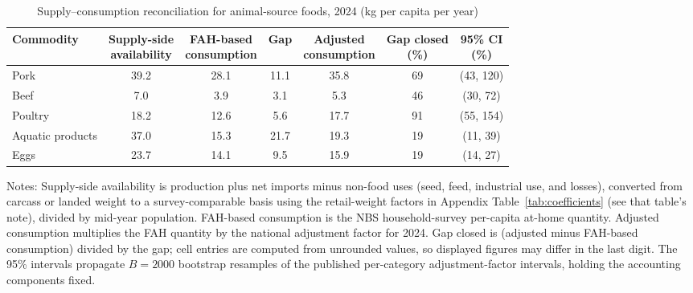 \documentclass[preprint,12pt,authoryear]{elsarticle}
\begin{document}
\begin{table}[htbp]
\centering
\begin{threeparttable}
\caption{Supply--consumption reconciliation for animal-source foods, 2024 (kg per capita per year)}
\label{tab:reconciliation}
\small
\setlength{\tabcolsep}{0pt}
\begin{tabular*}{\textwidth}{@{\extracolsep{\fill}} l cccccc @{}}
\toprule
Commodity & \shortstack{Supply-side\\availability} & \shortstack{FAH-based\\consumption} & Gap & \shortstack{Adjusted\\consumption} & \shortstack{Gap closed\\(\%)} & \shortstack{95\% CI\\(\%)} \\
\midrule
Pork             & 39.2 & 28.1 & 11.1 & 35.8 & 69 & (43, 120) \\
Beef             & 7.0  & 3.9  & 3.1  & 5.3  & 46 & (30, 72) \\
Poultry          & 18.2 & 12.6 & 5.6 & 17.7 & 91 & (55, 154) \\
Aquatic products & 37.0 & 15.3 & 21.7 & 19.3 & 19 & (11, 39) \\
Eggs             & 23.7 & 14.1 & 9.5 & 15.9 & 19 & (14, 27) \\
\bottomrule
\end{tabular*}
\begin{tablenotes}[flushleft]
\scriptsize
\item Notes: Supply-side availability is production plus net imports minus non-food uses (seed, feed, industrial use, and losses), converted from carcass or landed weight to a survey-comparable basis using the retail-weight factors in Appendix Table~\ref{tab:coefficients} (see that table's note), divided by mid-year population. FAH-based consumption is the NBS household-survey per-capita at-home quantity. Adjusted consumption multiplies the FAH quantity by the national adjustment factor for 2024. Gap closed is (adjusted minus FAH-based consumption) divided by the gap; cell entries are computed from unrounded values, so displayed figures may differ in the last digit. The 95\% intervals propagate $B=2000$ bootstrap resamples of the published per-category adjustment-factor intervals, holding the accounting components fixed.
\end{tablenotes}
\end{threeparttable}
\end{table}
\end{document}
